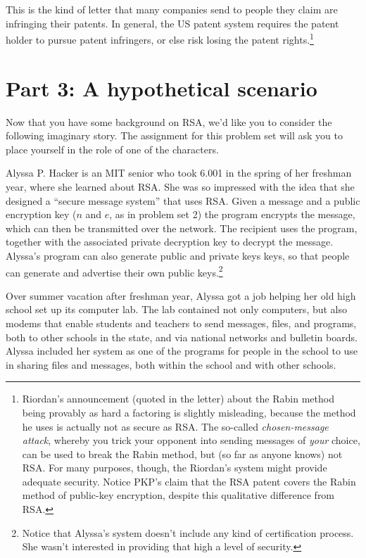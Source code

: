 This is the kind of letter that many companies send to people they
claim are infringing their patents.  In general, the US patent system
requires the patent holder to pursue patent infringers, or else risk
losing the patent rights.\footnote{Riordan's announcement (quoted in
the letter) about the Rabin method being provably as hard a factoring
is slightly misleading, because the method he uses is actually not as
secure as RSA.  The so-called {\it chosen-message attack}, whereby you
trick your opponent into sending messages of {\it your} choice, can be
used to break the Rabin method, but (so far as anyone knows) not RSA.
For many purposes, though, the Riordan's system might provide adequate
security.  Notice PKP's claim that the RSA patent covers the Rabin
method of public-key encryption, despite this qualitative difference
from RSA.}


\section{Part 3:  A hypothetical scenario}

Now that you have some background on RSA, we'd like you to consider
the following imaginary story.  The assignment for this problem set
will ask you to place yourself in the role of one of the characters.

Alyssa P. Hacker is an MIT senior who took 6.001 in the spring of her
freshman year, where she learned about RSA.  She was so impressed with
the idea that she designed a ``secure message system'' that uses RSA.
Given a message and a public encryption key ($n$ and $e$, as in
problem set 2) the program encrypts the message, which can then be
transmitted over the network.  The recipient uses the program,
together with the associated private decryption key to decrypt the
message.  Alyssa's program can also generate public and private keys
keys, so that people can generate and advertise their own public
keys.\footnote{Notice that Alyssa's system doesn't include any kind of
certification process.  She wasn't interested in providing that high a
level of security.}

Over summer vacation after freshman year, Alyssa got a job helping her
old high school set up its computer lab.  The lab contained not only
computers, but also modems that enable students and teachers to send
messages, files, and programs, both to other schools in the state, and
via national networks and bulletin boards.  Alyssa included her system
as one of the programs for people in the school to use in sharing
files and messages, both within the school and with other schools.

